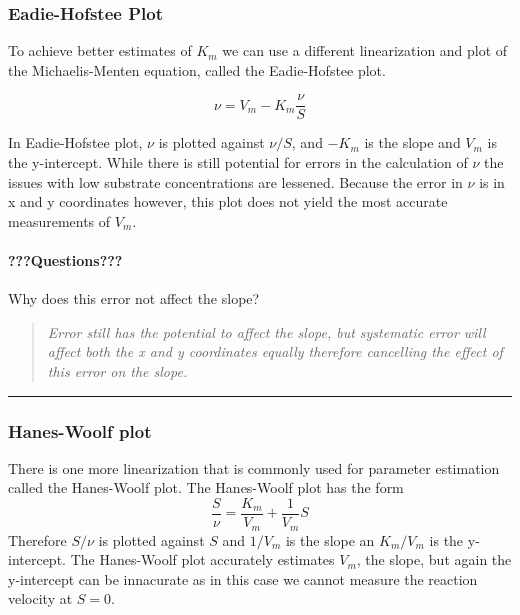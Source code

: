 \documentclass[
]{article}
\begin{document}
\hypertarget{eadie-hofstee-plot}{%
\subsubsection{Eadie-Hofstee Plot}\label{eadie-hofstee-plot}}

To achieve better estimates of \(K_m\) we can use a different linearization and plot of the Michaelis-Menten equation, called the Eadie-Hofstee plot.

\[\nu = V_m - K_m \frac{\nu}{S}\]

In Eadie-Hofstee plot, \(\nu\) is plotted against \(\nu/S\), and \(-K_m\) is the slope and \(V_m\) is the y-intercept. While there is still potential for errors in the calculation of \(\nu\) the issues with low substrate concentrations are lessened. Because the error in \(\nu\) is in x and y coordinates however, this plot does not yield the most accurate measurements of \(V_m\).

\hypertarget{questions-9}{%
\paragraph{???Questions???}\label{questions-9}}

Why does this error not affect the slope?

\begin{quote}
\emph{Error still has the potential to affect the slope, but systematic error will affect both the x and y coordinates equally therefore cancelling the effect of this error on the slope.}
\end{quote}

\begin{center}\rule{0.5\linewidth}{0.5pt}\end{center}

\hypertarget{hanes-woolf-plot}{%
\subsubsection{Hanes-Woolf plot}\label{hanes-woolf-plot}}

There is one more linearization that is commonly used for parameter estimation called the Hanes-Woolf plot. The Hanes-Woolf plot has the form
\[\frac{S}{\nu} = \frac{K_m}{V_m} + \frac{1}{V_m}S\]
Therefore \(S/\nu\) is plotted against \(S\) and \(1/V_m\) is the slope an \(K_m/V_m\) is the y-intercept. The Hanes-Woolf plot accurately estimates \(V_m\), the slope, but again the y-intercept can be innacurate as in this case we cannot measure the reaction velocity at \(S = 0\).
\end{document}
